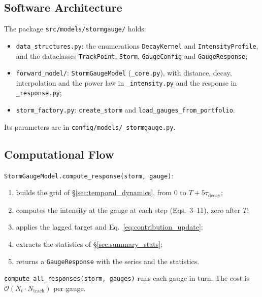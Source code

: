 \documentclass[11pt,a4paper]{article}
\begin{document}
\mkmimplementation

\subsection{Software Architecture}

The package \texttt{src/models/stormgauge/} holds:
\begin{itemize}[nosep]
    \item \texttt{data\_structures.py}: the enumerations \texttt{DecayKernel} and
          \texttt{IntensityProfile}, and the dataclasses \texttt{TrackPoint},
          \texttt{Storm}, \texttt{GaugeConfig} and \texttt{GaugeResponse};
    \item \texttt{forward\_model/}: \texttt{StormGaugeModel} (\texttt{\_core.py}), with
          distance, decay, interpolation and the power law in \texttt{\_intensity.py}
          and the response in \texttt{\_response.py};
    \item \texttt{storm\_factory.py}: \texttt{create\_storm} and
          \texttt{load\_gauges\_from\_portfolio}.
\end{itemize}
Its parameters are in \texttt{config/models/\_stormgauge.py}.

\subsection{Computational Flow}

\texttt{StormGaugeModel.compute\_response(storm, gauge)}:
\begin{enumerate}[nosep]
    \item builds the grid of \S\ref{sec:temporal_dynamics}, from 0 to
          $T + 5\tau_{\text{decay}}$;
    \item computes the intensity at the gauge at each step (Eqs.~3--11), zero after $T$;
    \item applies the lagged target and Eq.~\ref{eq:contribution_update};
    \item extracts the statistics of \S\ref{sec:summary_stats};
    \item returns a \texttt{GaugeResponse} with the series and the statistics.
\end{enumerate}
\texttt{compute\_all\_responses(storm, gauges)} runs each gauge in turn. The cost is
$\mathcal{O}(N_t \cdot N_{\text{track}})$ per gauge.
\end{document}
